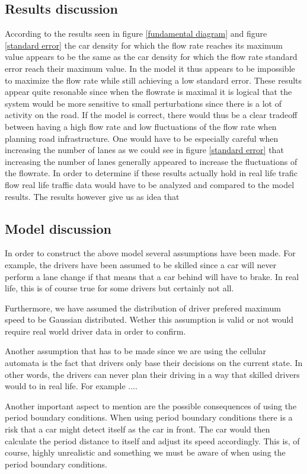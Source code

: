 \documentclass[a4paper,12pt]{article}
\begin{document}
\subsection*{Results discussion}
According to the results seen in figure \ref*{fundamental diagram} and figure \ref*{standard error} the car density for which the flow rate reaches its maximum value appears
to be the same as the car density for which the flow rate standard error reach their maximum value. In the model it thus appears to be impossible to maximize the flow rate while still
achieving a low standard error. These results appear quite resonable since when the flowrate is maximal it is logical that the system would be more sensitive
to small perturbations since there is a lot of activity on the road. If the model is correct, there would thus be a clear tradeoff between having a high flow rate and
low fluctuations of the flow rate when planning road infrastructure. One would have to be especially careful when increasing the number of lanes as we could see in figure
\ref*{standard error} that increasing the number of lanes generally appeared to increase the fluctuations of the flowrate.
In order to determine if these results actually hold in real life trafic flow real life traffic data would have to be analyzed and compared to the model results. The results however give us as 
idea that 

\subsection*{Model discussion}
In order to construct the above model several assumptions have been made. For example, the drivers have been assumed to be skilled
since a car will never perform a lane change if that means that a car behind will have to brake. In real life, this is of course true for some drivers 
but certainly not all.

Furthermore, we have assumed the distribution of driver prefered maximum speed to be Gaussian distributed. Wether this assumption is valid or not would require 
real world driver data in order to confirm.

Another assumption that has to be made since we are using the cellular automata is the fact that drivers only base their decisions on the current state. In other words, 
the drivers can never plan their driving in a way that skilled drivers would to in real life. For example ....

Another important aspect to mention are the possible consequences of using the period boundary conditions. When using period boundary conditions there is a risk
that a car might detect itself as the car in front. The car would then calculate the period distance to itself and adjust its speed accordingly. 
This is, of course, highly unrealistic and something we must be aware of when using the period boundary conditions.
\end{document}
